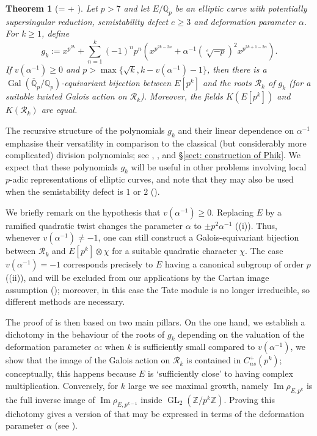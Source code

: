 \documentclass{amsart}
\newcommand{\op}[1]{\operatorname{#1}}
\newcommand{\Qp}{\mathbb{Q}_p}
\newtheorem{theorem}{Theorem}
\theoremstyle{definition}
\newcommand{\Z}{\mathbb{Z}}
\newcommand{\Q}{\mathbb{Q}}
\numberwithin{theorem}{section}
\numberwithin{equation}{section}
\begin{document}
\begin{theorem}[= + ]\label{introthm: alternative division polynomials}
    Let $p>7$ and let $E/\Qp$ be an elliptic curve with potentially supersingular reduction, semistability defect $e\geq 3$ and deformation parameter $\alpha$. For $k \geq 1$, define 
    \[
    g_k:=x^{p^{2k}} + \sum_{n=1}^k (-1)^np^n(x^{p^{2k-2n}} + \alpha^{-1}(\sqrt[e]{-p})^2x^{p^{2k+1-2n}}).
    \]
    If $v(\alpha^{-1}) \geq 0$ and $p> \max\{\sqrt{k}, k-v(\alpha^{-1})-1\}$, then there is a $\op{Gal}(\overline{\Q}_p/\Qp)$-equivariant bijection between $E[p^k]$ and the roots $\mathcal{R}_k$ of $g_k$ (for a suitable twisted Galois action on $\mathcal{R}_k$). Moreover, the fields $K(E[p^k])$ and $K(\mathcal{R}_k)$ are equal.
\end{theorem}

The recursive structure of the polynomials $g_k$ and their linear dependence on $\alpha^{-1}$ emphasise their versatility in comparison to the classical (but considerably more complicated) division polynomials; see , , and \S\ref{sect: construction of Phik}. We expect that these polynomials $g_k$ will be useful in other problems involving local $p$-adic representations of elliptic curves, and note that they may also be used when the semistability defect is $1$ or $2$ ().

We briefly remark on the hypothesis that $v(\alpha^{-1}) \geq 0$. Replacing $E$ by a ramified quadratic twist changes the parameter $\alpha$ to $\pm p^2\alpha^{-1}$ ((i)). Thus, whenever $v(\alpha^{-1}) \ne -1$, one can still construct a Galois-equivariant bijection between $\mathcal{R}_k$ and $E[p^k] \otimes \chi$ for a suitable quadratic character $\chi$. The case $v(\alpha^{-1})=-1$ corresponds precisely to $E$ having a canonical subgroup of order $p$ ((ii)), and will be excluded from our applications by the Cartan image assumption (); moreover, in this case the Tate module is no longer irreducible, so different methods are necessary.

The proof of  is then based on two main pillars. On the one hand, we establish a dichotomy in the behaviour of the roots of $g_k$ depending on the valuation of the deformation parameter $\alpha$: when $k$ is sufficiently small compared to $v(\alpha^{-1})$, we show that the image of the Galois action on $\mathcal{R}_k$ is contained in $C_{ns}^+(p^k)$; conceptually, this happens because $E$ is `sufficiently close' to having complex multiplication. Conversely, for $k$ large we see maximal growth, namely $\op{Im} \rho_{E,p^k}$ is the full inverse image of $\op{Im} \rho_{E,p^{k-1}}$ inside $\op{GL}_2(\Z/p^k\Z)$. Proving this dichotomy gives a version of  that may be expressed in terms of the deformation parameter $\alpha$ (see ).
\end{document}
